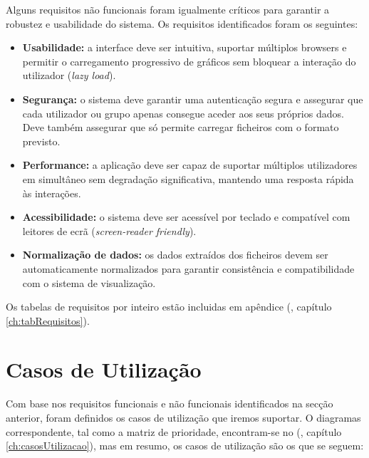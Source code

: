 Alguns requisitos não funcionais foram igualmente críticos para garantir a robustez e usabilidade do sistema. Os requisitos identificados foram os seguintes:

\begin{itemize}
    \item \textbf{Usabilidade:} a interface deve ser intuitiva, suportar múltiplos browsers e permitir o carregamento progressivo de gráficos sem bloquear a interação do utilizador (\textit{lazy load}).
    
    \item \textbf{Segurança:} o sistema deve garantir uma autenticação segura e assegurar que cada utilizador ou grupo apenas consegue aceder aos seus próprios dados. Deve também assegurar que só permite carregar ficheiros com o formato previsto.
    
    \item \textbf{Performance:} a aplicação deve ser capaz de suportar múltiplos utilizadores em simultâneo sem degradação significativa, mantendo uma resposta rápida às interações.
    
    \item \textbf{Acessibilidade:} o sistema deve ser acessível por teclado e compatível com leitores de ecrã (\textit{screen-reader friendly}).

    \item \textbf{Normalização de dados:} os dados extraídos dos ficheiros devem ser automaticamente normalizados para garantir consistência e compatibilidade com o sistema de visualização.

\end{itemize}

Os tabelas de requisitos por inteiro estão incluidas em apêndice (\cf, capítulo \ref{ch:tabRequisitos}).

\section{Casos de Utilização}

Com base nos requisitos funcionais e não funcionais identificados na secção anterior, foram definidos os casos de utilização que iremos suportar. O diagramas correspondente, tal como a matriz de prioridade, encontram-se no (\cf, capítulo \ref{ch:casosUtilizacao}), mas em resumo, os casos de utilização são os que se seguem:

